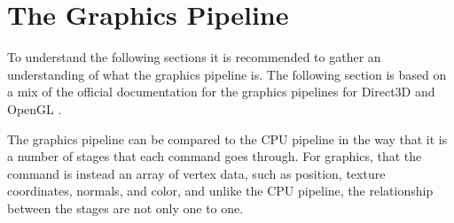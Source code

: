 \section{The Graphics Pipeline} \label{sec:pipeline}
\begin{sectionmeta}
To understand the following sections it is recommended to gather an understanding of what the graphics pipeline is.
The following section is based on a mix of the official documentation for the graphics pipelines for Direct3D and OpenGL \cite{khronos????pipeline, microsoft????pipeline}.
\end{sectionmeta}

The graphics pipeline can be compared to the \gls{CPU} pipeline in the way that it is a number of stages that each command goes through.
For graphics, that the command is instead an array of vertex data, such as position, texture coordinates, normals, and color, and unlike the \gls{CPU} pipeline, the relationship between the stages are not only one to one.

